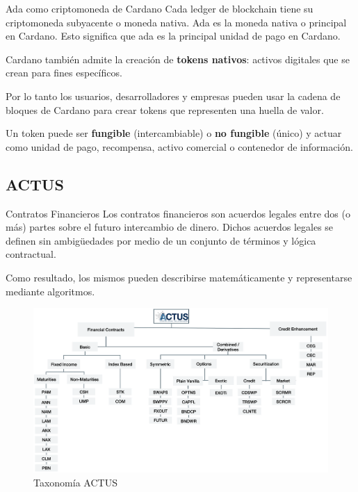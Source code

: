 \documentclass{beamer}
\begin{document}
\begin{frame}{Ada como criptomoneda de Cardano}
Cada ledger de blockchain tiene su criptomoneda subyacente o moneda nativa. Ada es la moneda
nativa o principal en Cardano. Esto significa que ada es la principal unidad de pago en Cardano.

\pause
\medskip

Cardano también admite la creación de \textbf{tokens nativos}: activos digitales que se crean para fines
específicos. 

\medskip
\pause

Por lo tanto los usuarios, desarrolladores y empresas pueden usar la cadena de bloques de Cardano para crear tokens que representen una huella de valor.

\pause
\medskip

Un token puede ser \textbf{fungible} (intercambiable) o \textbf{no fungible} (único) y actuar como unidad de pago, recompensa, activo
comercial o contenedor de información.

\end{frame}


\subsection{ACTUS}

\begin{frame}{Contratos Financieros}
Los contratos financieros son acuerdos legales entre dos (o más) partes sobre el futuro intercambio de dinero. Dichos acuerdos legales se definen sin ambigüedades por medio de un conjunto de términos y lógica contractual.

\pause
\vfill

Como resultado, los mismos pueden describirse matemáticamente y representarse mediante algoritmos.

\end{frame}

\begin{frame}[fragile]
\begin{figure}[H]
    \centering
    \includegraphics[width=\textwidth]{ACTUS_Taxonomy.png}
    \caption{Taxonomía ACTUS}
\end{figure}

\end{frame}
\end{document}
